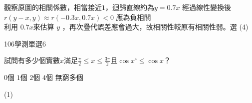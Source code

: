 \begin{QUESTIONS}
\begin{QUESTION}
\begin{QSOLLIST}
            \begin{QSOL}
                觀察原圖的相關係數，相當接近$1$，迴歸直線約為$y=0.7x$
                經過線性變換後 $r(y-x,y)\approx r(-0.3x,0.7x) <0$ 應為負相關\\
                利用 $0.7x$來估算 $y$ ，再次疊代誤差應會過大，故相關性較原有相關性弱。選 (4)
            \end{QSOL}
        \end{QSOLLIST}
        \begin{QEMPTYSPACE}
        \end{QEMPTYSPACE}
    \end{QUESTION}
    \begin{QUESTION}
        \begin{ExamInfo}{106}{學測}{單選}{6}
        \end{ExamInfo}
        \begin{ExamAnsRateInfo}{22}{43}{16}{7}
        \end{ExamAnsRateInfo}
        \begin{QBODY}
            試問有多少個實數$x$滿足$\frac{\pi }{2}\le x\le \frac{3\pi }{2}$且$\cos x{}^\circ \le \cos x$？
			\begin{QOPS}
				\QOP $0$個     
				\QOP $1$個     
				\QOP $2$個     
				\QOP $4$個     
				\QOP 無窮多個
			\end{QOPS}
        \end{QBODY}
        \begin{QFROMS}
        \end{QFROMS}
        \begin{QTAGS}\end{QTAGS}
        \begin{QANS}
            (1)
        \end{QANS}
        \begin{QSOLLIST}
            \begin{QOP}
                \begin{QSTEPS}

\end{QSTEPS}
\end{QOP}
\end{QSOLLIST}
\end{QUESTION}
\end{QUESTIONS}
